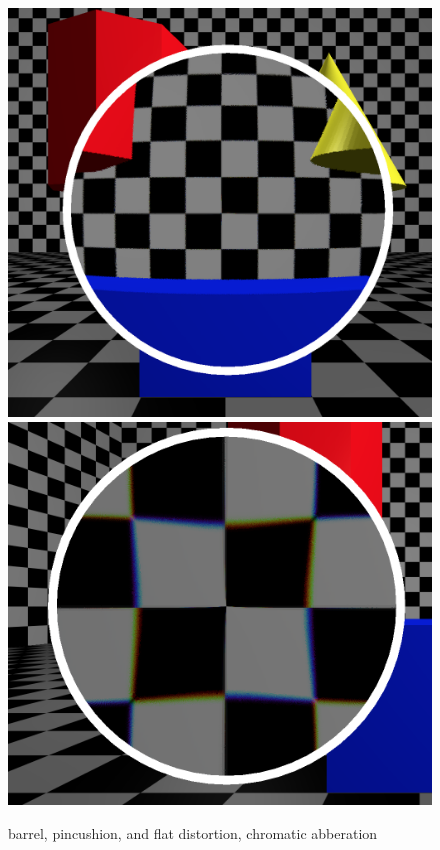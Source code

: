 \documentclass{beamer}
\begin{document}
\begin{frame}
\begin{figure}[htpb]
            \includegraphics[height=0.35\textheight]{images/flat}
            \includegraphics[height=0.35\textheight]{images/chroma}
        \caption{barrel, pincushion, and flat distortion, chromatic abberation}
        \end{figure}
\end{frame}
\end{document}
